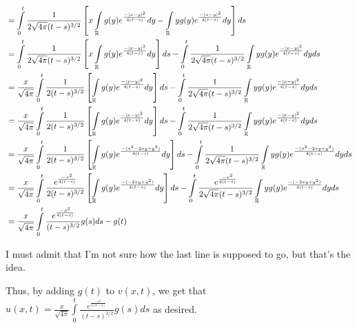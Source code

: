 \documentclass[a4paper,12pt]{article}
\begin{document}
\begin{align*}
&= \int\limits_0^t \frac{1}{2\sqrt{4 \pi }(t-s)^{3/2}} \left[x\int\limits_{\mathbb{R}} g(y) e^{\frac{-\left\lvert x-y \right\rvert^2}{4(t-s)}}dy - \int\limits_{\mathbb{R}} yg(y) e^{\frac{-\left\lvert x-y \right\rvert^2}{4(t-s)}} dy \right] ds \\
&= \int\limits_0^t \frac{1}{2\sqrt{4 \pi }(t-s)^{3/2}} \left[x\int\limits_{\mathbb{R}} g(y) e^{\frac{-\left\lvert x-y \right\rvert^2}{4(t-s)}}dy \right] ds - \int\limits_0^t \frac{1}{2\sqrt{4 \pi }(t-s)^{3/2}} \int\limits_{\mathbb{R}} yg(y) e^{\frac{-\left\lvert x-y \right\rvert^2}{4(t-s)}} dy ds \\
&= \frac{x}{\sqrt{4\pi}} \int\limits_0^t \frac{1}{2(t-s)^{3/2}} \left[\int\limits_{\mathbb{R}} g(y) e^{\frac{-\left\lvert x-y \right\rvert^2}{4(t-s)}}dy \right] ds - \int\limits_0^t \frac{1}{2\sqrt{4 \pi }(t-s)^{3/2}} \int\limits_{\mathbb{R}} yg(y) e^{\frac{-\left\lvert x-y \right\rvert^2}{4(t-s)}} dy ds \\
&= \frac{x}{\sqrt{4\pi}} \int\limits_0^t \frac{1}{2(t-s)^{3/2}} \left[\int\limits_{\mathbb{R}} g(y) e^{\frac{-\left\lvert x-y \right\rvert^2}{4(t-s)}}dy \right] ds - \int\limits_0^t \frac{1}{2\sqrt{4 \pi }(t-s)^{3/2}} \int\limits_{\mathbb{R}} yg(y) e^{\frac{-\left\lvert x-y \right\rvert^2}{4(t-s)}} dy ds \\
&= \frac{x}{\sqrt{4\pi}} \int\limits_0^t \frac{1}{2(t-s)^{3/2}} \left[\int\limits_{\mathbb{R}} g(y) e^{\frac{-(x^2-2xy+y^2)}{4(t-s)}}dy \right] ds - \int\limits_0^t \frac{1}{2\sqrt{4 \pi }(t-s)^{3/2}} \int\limits_{\mathbb{R}} yg(y) e^{\frac{-(x^2-2xy+y^2)}{4(t-s)}} dy ds \\
&= \frac{x}{\sqrt{4\pi}} \int\limits_0^t \frac{e^{\frac{-x^2}{4(t-s)}}}{2(t-s)^{3/2}} \left[\int\limits_{\mathbb{R}} g(y) e^{\frac{-(-2xy+y^2)}{4(t-s)}}dy \right] ds - \int\limits_0^t \frac{e^{\frac{-x^2}{4(t-s)}}}{2\sqrt{4 \pi }(t-s)^{3/2}} \int\limits_{\mathbb{R}} yg(y) e^{\frac{-(-2xy+y^2)}{4(t-s)}} dy ds \\
&= \frac{x}{\sqrt{4\pi}} \int\limits_0^t \frac{e^{\frac{-x^2}{4(t-s)}}}{(t-s)^{3/2}} g(s) ds - g(t) \\
\end{align*} %

I must admit that I'm not sure how the last line is supposed to go, but that's the idea.

Thus, by adding $g(t)$ to $v(x,t)$, we get that $u(x,t) = \frac{x}{\sqrt{4\pi}} \int\limits_0^t \frac{e^{\frac{-x^2}{4(t-s)}}}{(t-s)^{3/2}} g(s) ds$ as desired.


\shunt
\end{document}
